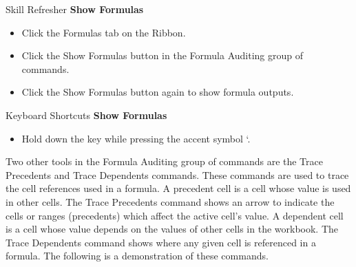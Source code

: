 \begin{center}
	\begin{sklbox}{Skill Refresher}
		\textbf{Show Formulas}
		\\
		\begin{itemize}
			\setlength{\itemsep}{0pt}
			\setlength{\parskip}{0pt}
			\setlength{\parsep}{0pt}
			
			\item Click the Formulas tab on the Ribbon.
			\item Click the Show Formulas button in the Formula Auditing group of commands.
			\item Click the Show Formulas button again to show formula outputs.
			
		\end{itemize}
	\end{sklbox}
\end{center}

\begin{center}
	\begin{shtcutbox}{Keyboard Shortcuts}
		\textbf{Show Formulas}
		\\
		\begin{itemize}
			\setlength{\itemsep}{0pt}
			\setlength{\parskip}{0pt}
			\setlength{\parsep}{0pt}
			
			\item Hold down the  key while pressing the accent symbol `.
			
		\end{itemize}
	\end{shtcutbox}
\end{center}

Two other tools in the Formula Auditing group of commands are the Trace Precedents and Trace Dependents commands. These commands are used to trace the cell references used in a formula. A precedent cell is a cell whose value is used in other cells. The Trace Precedents command shows an arrow to indicate the cells or ranges (precedents) which affect the active cell’s value. A dependent cell is a cell whose value depends on the values of other cells in the workbook. The Trace Dependents command shows where any given cell is referenced in a formula. The following is a demonstration of these commands.

